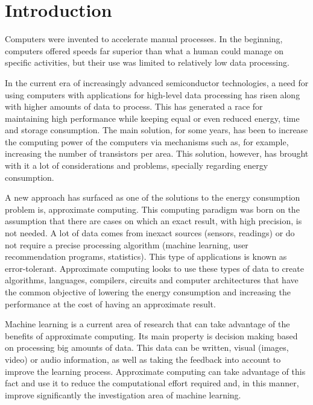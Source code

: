 
\chapter{Introduction}
\label{chp:intro}

Computers were invented to accelerate manual processes. In the beginning, computers
offered speeds far superior than what a human could manage on specific activities, but their use
was limited to relatively low data processing. 

In the current era of increasingly advanced semiconductor technologies, a need for using computers 
with applications for high-level data processing has risen along with higher amounts of data to process.
This has generated a race for maintaining high performance while keeping equal or even reduced 
energy, time and storage consumption. The main solution, for some years, has been to increase the 
computing power of the computers via mechanisms such as, for example, increasing the number of transistors
per area. This solution, however, has brought with it a lot of considerations and problems, specially 
regarding energy consumption.

A new approach has surfaced as one of the solutions to the energy consumption problem is, approximate computing.
This computing paradigm was born on the assumption that there are cases on which an exact result, with high precision,
is not needed. A lot of data comes from inexact sources (sensors, readings) or do not require a precise processing
algorithm (machine learning, user recommendation programs, statistics). This type of applications is
known as error-tolerant. Approximate computing looks to use these types of data to create algorithms,
languages, compilers, circuits and computer architectures that have the common objective of lowering
the energy consumption and increasing the performance at the cost of having an approximate result.

Machine learning is a current area of research that can take advantage of the benefits of approximate
computing. Its main property is
decision making based on processing big amounts of data. This data can be written, visual (images, video) or 
audio information, as well as taking the feedback into account to improve the learning process.
Approximate computing can take advantage of this fact and use it to reduce the computational effort
required and, in this manner, improve significantly the investigation area of machine learning.

